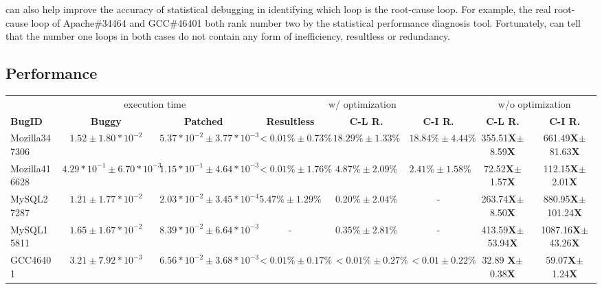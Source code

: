 \Tool can also help improve the accuracy of statistical debugging in
identifying which loop is the root-cause loop.
For example, the real root-cause loop of Apache\#34464 and GCC\#46401 both
rank number two by the statistical performance diagnosis tool.
Fortunately,
\Tool can tell that the number one loops in both cases do not contain
any form of inefficiency, resultless or redundancy. 

\subsection{Performance}
\label{sec:result_perf}

\begin{table*}[tb!]
  \centering
  \scriptsize
  \newcommand{\Yes}[1]{\checkmark{}$_#1$}
  \newcommand{\No}[0]{-}
  \begin{tabular}{lccccccc}
    \toprule
	    & \multicolumn{2}{c}{execution time} & \multicolumn{3}{c}{\Tool w/ optimization} & \multicolumn{2}{c}{w/o optimization} \\
     \cmidrule(lr){2-3}
     \cmidrule(lr){4-6}
     \cmidrule(lr){7-8}
     {\bf BugID}  & {\bf Buggy}  & {\bf Patched} & {\bf Resultless}  &  {\bf C-L R. } & {\bf C-I R. }  & {\bf C-L R.}  & {\bf C-I R. } \\
    \midrule
    Mozilla347306 &  $1.52\pm1.80*10^{-2}$ & $5.37*10^{-2}\pm3.77*10^{-3}$  &  $<0.01\%\pm0.73\%$  & $18.29\%\pm1.33\%$       &  $18.84\%\pm4.44\%$  & 355.51{\bf X}$\pm$8.59{\bf X} & 661.49{\bf X}$\pm$81.63{\bf X} \\ 
    Mozilla416628 &  $4.29*10^{-1}\pm6.70*10^{-3}$  & $1.15*10^{-1}\pm4.64*10^{-3}$  &  $<0.01\%\pm1.76\%$  & $4.87\%\pm2.09\%$ &  $2.41\%\pm1.58\%$ & 72.52{\bf X}$\pm$1.57{\bf X}  & 112.15{\bf X}$\pm$2.01{\bf X} \\
    \midrule
     MySQL27287   & $1.21\pm1.77*10^{-2}$& $2.03*10^{-2}\pm3.45*10^{-4}$ &  $5.47\%\pm1.29\%$   & $0.20\%\pm2.04\%$  &   - & 263.74{\bf X}$\pm$8.50{\bf X} & 880.95{\bf X}$\pm$101.24{\bf X} \\
     MySQL15811   & $1.65\pm1.67*10^{-2}$& $8.39*10^{-2}\pm6.64*10^{-3}$          &  -                   & $0.35\%\pm2.81\%$        &   -                  & 413.59{\bf X}$\pm$53.94{\bf X}& 1087.16{\bf X}$\pm$43.26{\bf X} \\
    \midrule
      GCC46401    & $3.21\pm7.92*10^{-3}$ & $6.56*10^{-2}\pm3.68*10^{-3}$          &  $<0.01\%\pm0.17\%$  & $<0.01\%\pm0.27\%$       &  $<0.01\pm0.22\%$    & 32.89 {\bf X}$\pm$0.38{\bf X} & 59.07{\bf X}$\pm$1.24{\bf X}\\ 

\end{tabular}
\end{table*}
